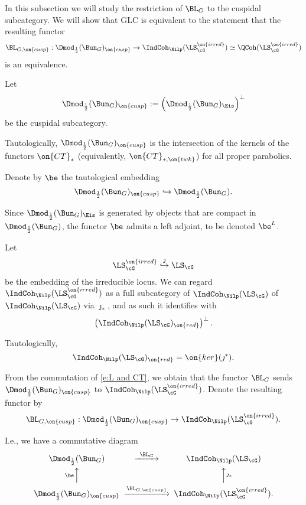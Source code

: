 \documentclass[9pt]{amsart}
\theoremstyle{remark}
\theoremstyle{definition}
\theoremstyle{remark}
\numberwithin{equation}{section}
\begin{document}

In this subsection we will study the restriction of $\BL_G$ to the cuspidal subcategory. 
We will show that GLC is equivalent to the statement that the resulting functor
$$\BL_{G,\on{cusp}}:\Dmod_{\frac{1}{2}}(\Bun_G)_{\on{cusp}}\to 
\IndCoh_\Nilp(\LS^{\on{irred}}_\cG)\simeq \QCoh(\LS^{\on{irred}}_\cG)$$
is an equivalence. 

\sssec{}

Let
$$\Dmod_{\frac{1}{2}}(\Bun_G)_{\on{cusp}}:=\left(\Dmod_{\frac{1}{2}}(\Bun_G)_{\Eis}\right)^\perp$$
be the cuspidal subcategory. 

\medskip

Tautologically, $\Dmod_{\frac{1}{2}}(\Bun_G)_{\on{cusp}}$ is the intersection of the kernels of the functors
$\on{CT}_*$ (equivalently, $\on{CT}_{*,\on{twk}}$) for all proper parabolics.

\sssec{}

Denote by $\be$ the tautological embedding
$$\Dmod_{\frac{1}{2}}(\Bun_G)_{\on{cusp}}\hookrightarrow \Dmod_{\frac{1}{2}}(\Bun_G).$$

Since $\Dmod_{\frac{1}{2}}(\Bun_G)_{\Eis}$ is generated by objects that are compact in $\Dmod_{\frac{1}{2}}(\Bun_G)$,
the functor $\be$ admits a left adjoint, to be denoted $\be^L$. 

\sssec{}

Let
$$\LS^{\on{irred}}_\cG \overset{\jmath}\hookrightarrow \LS_\cG$$
be the embedding of the irreducible locus. We can regard
$\IndCoh_\Nilp(\LS^{\on{irred}}_\cG)$ as a full subcategory of $\IndCoh_\Nilp(\LS_\cG)$ of $\IndCoh_\Nilp(\LS_\cG)$
via $\jmath_*$, and as such it identifies with 
$$\left(\IndCoh_\Nilp(\LS_\cG)_{\on{red}}\right)^\perp.$$

Tautologically,
$$\IndCoh_\Nilp(\LS_\cG)_{\on{red}}=\on{ker}(\jmath^*).$$

\sssec{}

From the commutation of \eqref{e:L and CT}, we obtain that the functor $\BL_G$ sends
$\Dmod_{\frac{1}{2}}(\Bun_G)_{\on{cusp}}$ to $\IndCoh_\Nilp(\LS^{\on{irred}}_\cG)$.
Denote the resulting functor by
\begin{equation} \label{e:L cusp}
\BL_{G,\on{cusp}}:\Dmod_{\frac{1}{2}}(\Bun_G)_{\on{cusp}}\to \IndCoh_\Nilp(\LS^{\on{irred}}_\cG).
\end{equation}

I.e., we have a commutative diagram
\begin{equation} \label{e:L cusp diagram in}
\CD
\Dmod_{\frac{1}{2}}(\Bun_G) @>{\BL_G}>> \IndCoh_\Nilp(\LS_\cG) \\
@A{\be}AA @AA{\jmath_*}A  \\
\Dmod_{\frac{1}{2}}(\Bun_G)_{\on{cusp}} @>{\BL_{G,\on{cusp}}}>>  \IndCoh_\Nilp(\LS^{\on{irred}}_\cG).
\endCD
\end{equation} 
\end{document}

